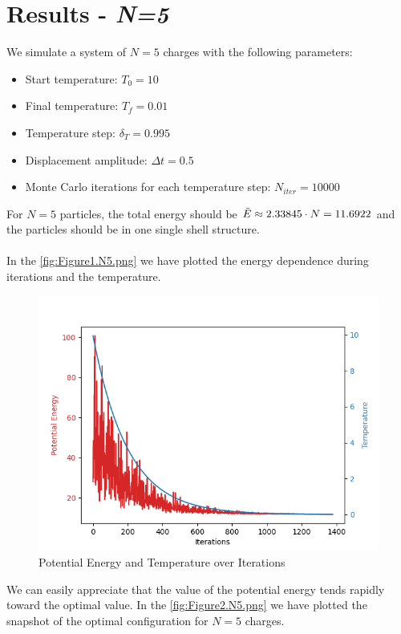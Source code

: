 \documentclass{article}
\begin{document}
\section{Results - \textit{N=5}}
We simulate a system of $N=5$ charges with the following parameters:
\begin{itemize}
    \item Start temperature: $T_0=10$
    \item Final temperature: $T_f=0.01$
    \item Temperature step: $\delta_T=0.995$
    \item Displacement amplitude: $\Delta t=0.5$
    \item Monte Carlo iterations for each temperature step: $N_{iter}=10000$
\end{itemize}
For $N=5$ particles, the total energy should be $\Tilde{E}\approx2.33845\cdot N=11.6922$ and the particles should be in one single shell structure.\\\\
In the \autoref{fig:Figure1.N5.png} we have plotted the energy dependence during iterations and the temperature.
\begin{figure}[H]
    \centering
    \includegraphics[width=\linewidth]{images/Figure1.N5.png}
    \caption{Potential Energy and Temperature over Iterations}
    \label{fig:Figure1.N5.png}
\end{figure}
\noindent We can easily appreciate that the value of the potential energy tends rapidly toward the optimal value.
\clearpage
\noindent In the \autoref{fig:Figure2.N5.png} we have plotted the snapshot of the optimal configuration for $N=5$ charges.
\end{document}
